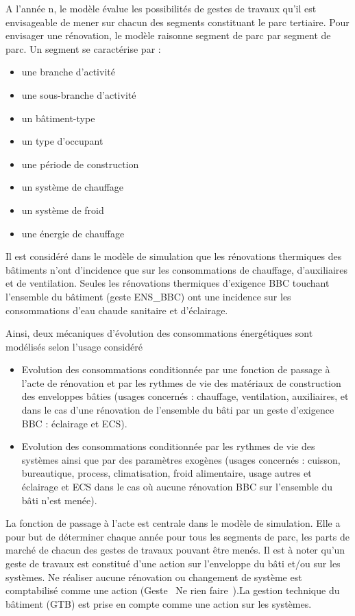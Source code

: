 \documentclass[10.5pt,a4paper]{article}
\begin{document}
{A l’année n, le modèle évalue les possibilités de gestes de travaux qu’il est envisageable de mener sur chacun des segments constituant le parc tertiaire. 
Pour envisager une rénovation, le modèle raisonne segment de parc par segment de parc. Un segment se caractérise par :
\begin{itemize}
\item une branche d’activité
\item une sous-branche d’activité
\item un bâtiment-type
\item un type d’occupant
\item une période de construction
\item un système de chauffage
\item un système de froid
\item une énergie de chauffage
\end{itemize} 

Il est considéré dans le modèle de simulation que les rénovations thermiques des bâtiments n’ont d’incidence que sur les consommations de chauffage, d’auxiliaires et de ventilation. Seules les rénovations thermiques d’exigence BBC  touchant l’ensemble du bâtiment (geste ENS\_BBC) ont une incidence sur les consommations d’eau chaude sanitaire et d’éclairage.

Ainsi, deux mécaniques d’évolution des consommations énergétiques sont modélisés selon l’usage considéré
\begin{itemize}

 \item Evolution des consommations conditionnée par une fonction de passage à l’acte de rénovation et par les rythmes de vie des matériaux de construction des enveloppes bâties (usages concernés : chauffage, ventilation, auxiliaires, et dans le cas d’une rénovation de l’ensemble du bâti par un geste d’exigence BBC : éclairage et ECS).

\item Evolution des consommations conditionnée par les rythmes de vie des systèmes ainsi que par des paramètres exogènes (usages concernés : cuisson, bureautique, process, climatisation, froid alimentaire, usage autres et éclairage et ECS dans le cas où aucune rénovation BBC sur l’ensemble du bâti n’est menée).
\end{itemize} 

La fonction de passage à l’acte est centrale dans le modèle de simulation. Elle a pour but de déterminer chaque année pour tous les segments de parc, les parts de marché de chacun des gestes de travaux pouvant être menés. Il est à noter qu’un geste de travaux est constitué d’une action sur l’enveloppe du bâti et/ou sur les systèmes. Ne réaliser aucune rénovation ou changement de système est comptabilisé comme une action (Geste \og~Ne rien faire~\fg).La gestion technique du bâtiment (GTB) est prise en compte comme une action sur les systèmes.


}
\end{document}

